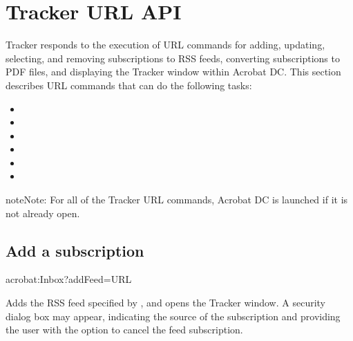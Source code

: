 \documentclass[letterpaper,12pt,english,openany,oneside]{sphinxmanual}
\begin{document}
\section{Tracker URL API}
\label{\detokenize{Tracker_InboxAPI:tracker-url-api}}
Tracker responds to the execution of URL commands for adding, updating, selecting, and removing subscriptions to RSS feeds, converting subscriptions to PDF files, and displaying the Tracker window within Acrobat DC. This section describes URL commands that can do the following tasks:
\begin{itemize}
\item {} 

\item {} 

\item {} 

\item {} 

\item {} 

\item {} 

\end{itemize}

\begin{sphinxadmonition}{note}{Note:}
For all of the Tracker URL commands, Acrobat DC is launched if it is not already open.
\end{sphinxadmonition}




\subsection{Add a subscription}
\label{\detokenize{Tracker_InboxAPI:add-a-subscription}}
\begin{sphinxVerbatim}[commandchars=\\\{\}]
acrobat:Inbox?addFeed=\PYGZlt{}URL\PYGZgt{}
\end{sphinxVerbatim}

Adds the RSS feed specified by , and opens the Tracker window. A security dialog box may appear, indicating the source of the subscription and providing the user with the option to cancel the feed subscription.
\end{document}
